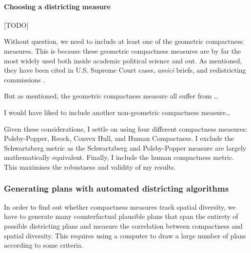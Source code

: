 \documentclass[]{article}
\let\oldparagraph\paragraph
\renewcommand{\paragraph}[1]{\oldparagraph{#1}\mbox{}}
\begin{document}
\hypertarget{choosing-a-districting-measure}{%
\paragraph{Choosing a districting
measure}\label{choosing-a-districting-measure}}

{[}TODO{]}

Without question, we need to include at least one of the geometric
compactness measures. This is because these geometric compactness
measures are by far the most widely used both inside academic political
science and out. As mentioned, they have been cited in U.S. Supreme
Court cases, \emph{amici} briefs, and redistricting commissions
\citep{moncrief2011}.

But as mentioned, the geometric compactness measure all suffer from
\ldots{}

I would have liked to include another non-geometric compactness
measure\ldots{}

Given these considerations, I settle on using four different compactness
measures: Polsby-Popper, Reock, Convex Hull, and Human Compactness. I
exclude the Schwartzberg metric as the Schwartzberg and Polsby-Popper
measure are largely mathematically equivalent. Finally, I include the
human compactness metric. This maximises the robustness and validity of
my results.

\hypertarget{generating-plans-with-automated-districting-algorithms}{%
\subsubsection{Generating plans with automated districting
algorithms}\label{generating-plans-with-automated-districting-algorithms}}

In order to find out whether compactness measures track spatial
diversity, we have to generate many counterfactual plausible plans that
span the entirety of possible districting plans and measure the
correlation between compactness and spatial diversity. This requires
using a computer to draw a large number of plans according to some
criteria.
\end{document}

